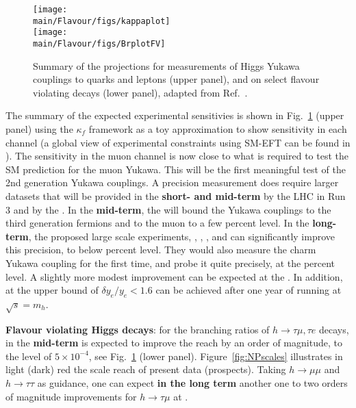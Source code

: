 \begin{figure}[t]
	\centering
	\texttt{[image: \\main/Flavour/figs/kappaplot]}\vspace*{3mm}\\
       \texttt{[image: \\main/Flavour/figs/BrplotFV]}
	\caption{Summary of the  projections for measurements of Higgs Yukawa couplings to quarks and leptons (upper panel), and on select flavour violating decays (lower panel), adapted from Ref.~\cite{Heinemann:2019trx}. 
	\label{fig:higgs:forecast}}
\end{figure}
The summary of the expected experimental sensitivies is shown in Fig.~\ref{fig:higgs:forecast} (upper panel) using the $\kappa_f$ framework as a toy approximation to show sensitivity in each channel (a global view of experimental constraints using SM-EFT can be found in \cite{deBlas:2019rxi}). 
The sensitivity in the muon channel is now close to what is required to test the SM prediction for the muon Yukawa. This will be the first meaningful test of the 2nd generation Yukawa couplings. A precision measurement does require larger datasets that will be provided in the {\bf short- and mid-term} by the LHC in Run 3 and by the \HLLHC.
In the {\bf mid-term}, the \HLLHC will bound the Yukawa couplings to the third generation fermions and to the muon to a few percent level. 
In the {\bf long-term}, the proposed large scale experiments, \ILC, \FCCee, \CEPC, and \CLIC can significantly improve this precision, to below percent level. They would also measure the charm Yukawa coupling for the first time, and probe it quite precisely, at the percent level. A slightly more modest improvement can be expected at the \HELHC \cite{deBlas:2019rxi}. 
In addition, at \FCCee the upper bound of $\delta y_e/y_e<1.6$ can be achieved after
one year of running at $\sqrt{s}=m_h$. 

\textbf{ Flavour violating Higgs decays}: for the branching ratios of $h\to \tau\mu, \tau e$ decays,  in the {\bf mid-term}  \HLLHC is expected to improve the reach by an order of magnitude, to the level of $5\times 10^{-4}$, see Fig.~\ref{fig:higgs:forecast} (lower panel).  
Figure~\ref{fig:NPscales} illustrates in light (dark) red the scale reach of present data (\HLLHC prospects). Taking $h\to \mu\mu$ and $h\to \tau\tau$ as guidance, one can expect {\bf in the long term} another one to two orders of magnitude improvements for $h\to \tau\mu$ at \FCChh \cite{deBlas:2019rxi}.


